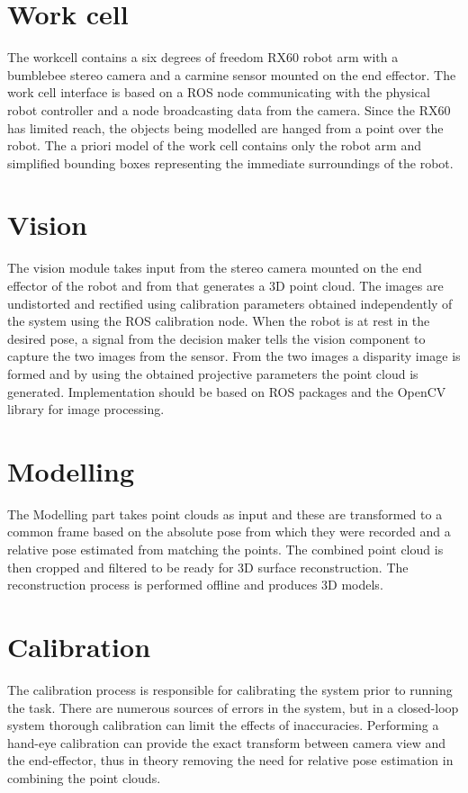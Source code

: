 \section{Work cell}
The workcell contains a six degrees of freedom RX60 robot arm with a bumblebee stereo camera and a carmine sensor mounted on the end effector. The work cell interface is based on a ROS node communicating with the physical robot controller and a node broadcasting data from the camera. Since the RX60 has limited reach, the objects being modelled are hanged from a point over the robot. The a priori model of the work cell contains only the robot arm and simplified bounding boxes representing the immediate surroundings of the robot. 

\section{Vision}
The vision module takes input from the stereo camera mounted on the end effector of the robot and from that generates a 3D point cloud. The images are undistorted and rectified using calibration parameters obtained independently of the system using the ROS calibration node. When the robot is at rest in the desired pose, a signal from the decision maker tells the vision component to capture the two images from the sensor. From the two images a disparity image is formed and by using the obtained projective parameters the point cloud is generated. Implementation should be based on ROS packages and the OpenCV library for image processing.

\section{Modelling}
The Modelling part takes point clouds as input and these are transformed to a common frame based on the absolute pose from which they were recorded and a relative pose estimated from matching the points. The combined point cloud is then cropped and filtered to be ready for 3D surface reconstruction. The reconstruction process is performed offline and produces 3D models.

\section{Calibration}
The calibration process is responsible for calibrating the system prior to running the task. There are numerous sources of errors in the system, but in a closed-loop system thorough calibration can limit the effects of inaccuracies. Performing a hand-eye calibration can provide the exact transform between camera view and the end-effector, thus in theory removing the need for relative pose estimation in combining the point clouds.


